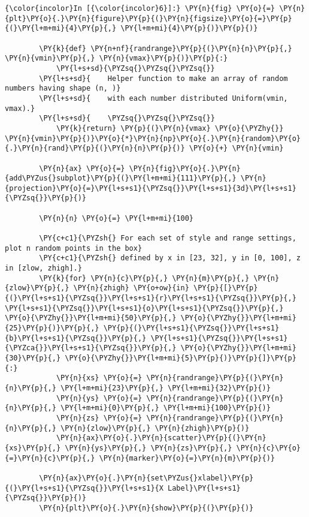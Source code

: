     \begin{Verbatim}[commandchars=\\\{\},frame=single,framerule=0.3mm,rulecolor=\color{cellframecolor}]
{\color{incolor}In [{\color{incolor}6}]:} \PY{n}{fig} \PY{o}{=} \PY{n}{plt}\PY{o}{.}\PY{n}{figure}\PY{p}{(}\PY{n}{figsize}\PY{o}{=}\PY{p}{(}\PY{l+m+mi}{4}\PY{p}{,} \PY{l+m+mi}{4}\PY{p}{)}\PY{p}{)}
        
        \PY{k}{def} \PY{n+nf}{randrange}\PY{p}{(}\PY{n}{n}\PY{p}{,} \PY{n}{vmin}\PY{p}{,} \PY{n}{vmax}\PY{p}{)}\PY{p}{:}
            \PY{l+s+sd}{\PYZsq{}\PYZsq{}\PYZsq{}}
        \PY{l+s+sd}{    Helper function to make an array of random numbers having shape (n, )}
        \PY{l+s+sd}{    with each number distributed Uniform(vmin, vmax).}
        \PY{l+s+sd}{    \PYZsq{}\PYZsq{}\PYZsq{}}
            \PY{k}{return} \PY{p}{(}\PY{n}{vmax} \PY{o}{\PYZhy{}} \PY{n}{vmin}\PY{p}{)}\PY{o}{*}\PY{n}{np}\PY{o}{.}\PY{n}{random}\PY{o}{.}\PY{n}{rand}\PY{p}{(}\PY{n}{n}\PY{p}{)} \PY{o}{+} \PY{n}{vmin}
        
        \PY{n}{ax} \PY{o}{=} \PY{n}{fig}\PY{o}{.}\PY{n}{add\PYZus{}subplot}\PY{p}{(}\PY{l+m+mi}{111}\PY{p}{,} \PY{n}{projection}\PY{o}{=}\PY{l+s+s1}{\PYZsq{}}\PY{l+s+s1}{3d}\PY{l+s+s1}{\PYZsq{}}\PY{p}{)}
        
        \PY{n}{n} \PY{o}{=} \PY{l+m+mi}{100}
        
        \PY{c+c1}{\PYZsh{} For each set of style and range settings, plot n random points in the box}
        \PY{c+c1}{\PYZsh{} defined by x in [23, 32], y in [0, 100], z in [zlow, zhigh].}
        \PY{k}{for} \PY{n}{c}\PY{p}{,} \PY{n}{m}\PY{p}{,} \PY{n}{zlow}\PY{p}{,} \PY{n}{zhigh} \PY{o+ow}{in} \PY{p}{[}\PY{p}{(}\PY{l+s+s1}{\PYZsq{}}\PY{l+s+s1}{r}\PY{l+s+s1}{\PYZsq{}}\PY{p}{,} \PY{l+s+s1}{\PYZsq{}}\PY{l+s+s1}{o}\PY{l+s+s1}{\PYZsq{}}\PY{p}{,} \PY{o}{\PYZhy{}}\PY{l+m+mi}{50}\PY{p}{,} \PY{o}{\PYZhy{}}\PY{l+m+mi}{25}\PY{p}{)}\PY{p}{,} \PY{p}{(}\PY{l+s+s1}{\PYZsq{}}\PY{l+s+s1}{b}\PY{l+s+s1}{\PYZsq{}}\PY{p}{,} \PY{l+s+s1}{\PYZsq{}}\PY{l+s+s1}{\PYZca{}}\PY{l+s+s1}{\PYZsq{}}\PY{p}{,} \PY{o}{\PYZhy{}}\PY{l+m+mi}{30}\PY{p}{,} \PY{o}{\PYZhy{}}\PY{l+m+mi}{5}\PY{p}{)}\PY{p}{]}\PY{p}{:}
            \PY{n}{xs} \PY{o}{=} \PY{n}{randrange}\PY{p}{(}\PY{n}{n}\PY{p}{,} \PY{l+m+mi}{23}\PY{p}{,} \PY{l+m+mi}{32}\PY{p}{)}
            \PY{n}{ys} \PY{o}{=} \PY{n}{randrange}\PY{p}{(}\PY{n}{n}\PY{p}{,} \PY{l+m+mi}{0}\PY{p}{,} \PY{l+m+mi}{100}\PY{p}{)}
            \PY{n}{zs} \PY{o}{=} \PY{n}{randrange}\PY{p}{(}\PY{n}{n}\PY{p}{,} \PY{n}{zlow}\PY{p}{,} \PY{n}{zhigh}\PY{p}{)}
            \PY{n}{ax}\PY{o}{.}\PY{n}{scatter}\PY{p}{(}\PY{n}{xs}\PY{p}{,} \PY{n}{ys}\PY{p}{,} \PY{n}{zs}\PY{p}{,} \PY{n}{c}\PY{o}{=}\PY{n}{c}\PY{p}{,} \PY{n}{marker}\PY{o}{=}\PY{n}{m}\PY{p}{)}
        
        \PY{n}{ax}\PY{o}{.}\PY{n}{set\PYZus{}xlabel}\PY{p}{(}\PY{l+s+s1}{\PYZsq{}}\PY{l+s+s1}{X Label}\PY{l+s+s1}{\PYZsq{}}\PY{p}{)}
        \PY{n}{plt}\PY{o}{.}\PY{n}{show}\PY{p}{(}\PY{p}{)}
\end{Verbatim}



